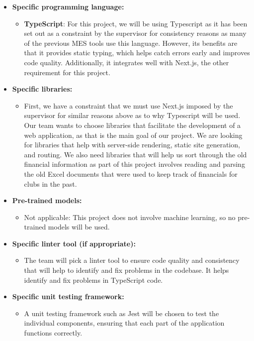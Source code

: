 \documentclass{article}
\begin{document}
\begin{itemize}
  \item \textbf{Specific programming language:}
  \begin{itemize}
      \item \textbf{TypeScript}: For this project, we will be using Typescript as it has been set out as a constraint by the supervisor for consistency reasons as many of the previous MES tools use this language. However, its benefits are that it provides static typing, which helps catch errors early and improves code quality. Additionally, it integrates well with Next.js, the other requirement for this project.
  \end{itemize}
  
  \item \textbf{Specific libraries:}
  
  \begin{itemize}
    \item First, we have a constraint that we must use Next.js imposed by the supervisor for similar reasons above as to why Typescript will be used. Our team wants to choose libraries that facilitate the development of a web application, as that is the main goal of our project. We are looking for libraries that help with server-side rendering, static site generation, and routing. We also need libraries that will help us sort through the old financial information as part of this project involves reading and parsing the old Excel documents that were used to keep track of financials for clubs in the past.
  \end{itemize}
  
  \item \textbf{Pre-trained models:}
  \begin{itemize}
      \item Not applicable: This project does not involve machine learning, so no pre-trained models will be used.
  \end{itemize}
  
  \item \textbf{Specific linter tool (if appropriate):}
  \begin{itemize}
    \item The team will pick a linter tool to ensure code quality and consistency that will help to identify and fix problems in the codebase. It helps identify and fix problems in TypeScript code.
  \end{itemize}
  
  \item \textbf{Specific unit testing framework:}
  \begin{itemize}
    \item  A unit testing framework such as Jest will be chosen to test the individual components, ensuring that each part of the application functions correctly.
  \end{itemize}
  

\end{itemize}
\end{document}
